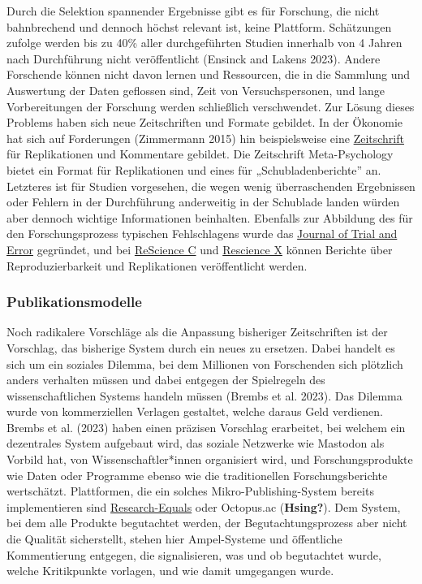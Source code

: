 \documentclass[
  letterpaper,
  DIV=11,
  numbers=noendperiod]{scrreprt}
\begin{document}
Durch die Selektion spannender Ergebnisse gibt es für Forschung, die
nicht bahnbrechend und dennoch höchst relevant ist, keine Plattform.
Schätzungen zufolge werden bis zu 40\% aller durchgeführten Studien
innerhalb von 4 Jahren nach Durchführung nicht veröffentlicht (Ensinck
and Lakens 2023). Andere Forschende können nicht davon lernen und
Ressourcen, die in die Sammlung und Auswertung der Daten geflossen sind,
Zeit von Versuchspersonen, und lange Vorbereitungen der Forschung werden
schließlich verschwendet. Zur Lösung dieses Problems haben sich neue
Zeitschriften und Formate gebildet. In der Ökonomie hat sich auf
Forderungen (Zimmermann 2015) hin beispielsweise eine
\href{jcr-econ.org}{Zeitschrift} für Replikationen und Kommentare
gebildet. Die Zeitschrift Meta-Psychology bietet ein Format für
Replikationen und eines für „Schubladenberichte'' an. Letzteres ist für
Studien vorgesehen, die wegen wenig überraschenden Ergebnissen oder
Fehlern in der Durchführung anderweitig in der Schublade landen würden
aber dennoch wichtige Informationen beinhalten. Ebenfalls zur Abbildung
des für den Forschungsprozess typischen Fehlschlagens wurde das
\href{https://journal.trialanderror.org}{Journal of Trial and Error}
gegründet, und bei \href{https://rescience.github.io/board/}{ReScience
C} und \href{rescience.org/x}{Rescience X} können Berichte über
Reproduzierbarkeit und Replikationen veröffentlicht werden.

\subsubsection{Publikationsmodelle}\label{publikationsmodelle}

Noch radikalere Vorschläge als die Anpassung bisheriger Zeitschriften
ist der Vorschlag, das bisherige System durch ein neues zu ersetzen.
Dabei handelt es sich um ein soziales Dilemma, bei dem Millionen von
Forschenden sich plötzlich anders verhalten müssen und dabei entgegen
der Spielregeln des wissenschaftlichen Systems handeln müssen (Brembs et
al. 2023). Das Dilemma wurde von kommerziellen Verlagen gestaltet,
welche daraus Geld verdienen. Brembs et al. (2023) haben einen präzisen
Vorschlag erarbeitet, bei welchem ein dezentrales System aufgebaut wird,
das soziale Netzwerke wie Mastodon als Vorbild hat, von
Wissenschaftler*innen organisiert wird, und Forschungsprodukte wie Daten
oder Programme ebenso wie die traditionellen Forschungsberichte
wertschätzt. Plattformen, die ein solches Mikro-Publishing-System
bereits implementieren sind
\href{https://www.researchequals.com/}{Research-Equals} oder Octopus.ac
(\textbf{Hsing?}). Dem System, bei dem alle Produkte begutachtet werden,
der Begutachtungsprozess aber nicht die Qualität sicherstellt, stehen
hier Ampel-Systeme und öffentliche Kommentierung entgegen, die
signalisieren, was und ob begutachtet wurde, welche Kritikpunkte
vorlagen, und wie damit umgegangen wurde.
\end{document}
